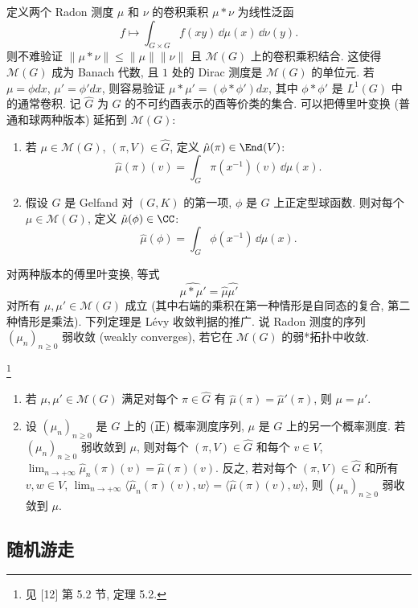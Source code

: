 定义两个 Radon 测度 $\mu$ 和 $\nu$ 的卷积乘积 $\mu * \nu$ 为线性泛函
\[
f \longmapsto \int_{G \times G}f(xy)\,\dd\mu(x)\,\dd\nu(y).
\]
则不难验证 $\|\mu * \nu\| \leq \|\mu\|\|\nu\|$ 且 $\mathcal{M}(G)$ 上的卷积乘积结合. 这使得 $\mathcal{M}(G)$ 成为 Banach 代数, 且 $1$ 处的 Dirac 测度是 $\mathcal{M}(G)$ 的单位元.
若 $\mu = \phi dx$, $\mu' = \phi' dx$, 则容易验证 $\mu * \mu' = (\phi * \phi')dx$, 其中 $\phi * \phi'$ 是 $L^1(G)$ 中的通常卷积.
记 $\widehat{G}$ 为 $G$ 的不可约酉表示的酉等价类的集合. 可以把傅里叶变换 (普通和球两种版本) 延拓到 $\mathcal{M}(G)$:
\begin{enumerate}
\item[(1)] 若 $\mu \in \mathcal{M}(G)$, $(\pi, V) \in \widehat{G}$, 定义 $\hat{\mu}(\pi) \in \End(V)$:
\[
\hat{\mu}(\pi)(v) = \int_G\pi(x^{-1})(v)\,\dd\mu(x).
\]
\item[(2)] 假设 $G$ 是 Gelfand 对 $(G, K)$ 的第一项, $\phi$ 是 $G$ 上正定型球函数. 则对每个 $\mu \in \mathcal{M}(G)$, 定义 $\hat{\mu}(\phi) \in \CC$:
\[
\hat{\mu}(\phi) = \int_G\phi(x^{-1})\,\dd\mu(x).
\]
\end{enumerate}
对两种版本的傅里叶变换, 等式
\[
\widehat{\mu * \mu'} = \hat{\mu}\hat{\mu'}
\]
对所有 $\mu, \mu' \in \mathcal{M}(G)$ 成立 (其中右端的乘积在第一种情形是自同态的复合, 第二种情形是乘法).
下列定理是 L\'evy 收敛判据的推广. 说 Radon 测度的序列 $(\mu_n)_{n \geq 0}$ 弱收敛 (weakly converges), 若它在 $\mathcal{M}(G)$ 的弱*拓扑中收敛.

\begin{theorem}\footnote{见 {[}12{]} 第 5.2 节, 定理 5.2.}
\label{thm:VI.6.1.3}
\begin{enumerate}
\item[(i)] 若 $\mu, \mu' \in \mathcal{M}(G)$ 满足对每个 $\pi \in \widehat{G}$ 有 $\hat{\mu}(\pi) = \hat{\mu}'(\pi)$, 则 $\mu = \mu'$.
\item[(ii)] 设 $(\mu_n)_{n \geq 0}$ 是 $G$ 上的 (正) 概率测度序列, $\mu$ 是 $G$ 上的另一个概率测度. 若 $(\mu_n)_{n \geq 0}$ 弱收敛到 $\mu$, 则对每个 $(\pi, V) \in \widehat{G}$ 和每个 $v \in V$, $\lim_{n \to +\infty}\hat{\mu}_n(\pi)(v) = \hat{\mu}(\pi)(v)$. 反之, 若对每个 $(\pi, V) \in \widehat{G}$ 和所有 $v, w \in V$, $\lim_{n \to +\infty}\langle \hat{\mu}_n(\pi)(v), w \rangle = \langle \hat{\mu}(\pi)(v), w \rangle$, 则 $(\mu_n)_{n \geq 0}$ 弱收敛到 $\mu$.
\end{enumerate}
\end{theorem}

\subsection{随机游走}

